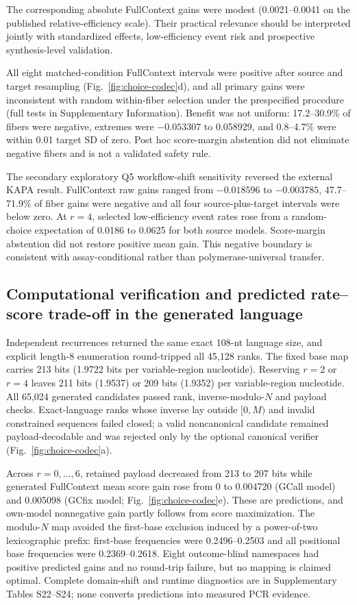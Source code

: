 \documentclass[unnumsec,webpdf,modern,large]{oup-authoring-template}
\begin{document}
The corresponding absolute FullContext gains were modest (0.0021--0.0041 on the published relative-efficiency scale). Their practical relevance should be interpreted jointly with standardized effects, low-efficiency event risk and prospective synthesis-level validation.

All eight matched-condition FullContext intervals were positive after source and target resampling (Fig.~\ref{fig:choice-codec}d), and all primary gains were inconsistent with random within-fiber selection under the prespecified procedure (full tests in Supplementary Information). Benefit was not uniform: 17.2--30.9\% of fibers were negative, extremes were $-0.053307$ to 0.058929, and 0.8--4.7\% were within 0.01 target SD of zero. Post hoc score-margin abstention did not eliminate negative fibers and is not a validated safety rule.

The secondary exploratory Q5 workflow-shift sensitivity reversed the external KAPA result. FullContext raw gains ranged from $-0.018596$ to $-0.003785$, 47.7--71.9\% of fiber gains were negative and all four source-plus-target intervals were below zero. At $r=4$, selected low-efficiency event rates rose from a random-choice expectation of 0.0186 to 0.0625 for both source models. Score-margin abstention did not restore positive mean gain. This negative boundary is consistent with assay-conditional rather than polymerase-universal transfer.

\subsection{Computational verification and predicted rate--score trade-off in the generated language}

Independent recurrences returned the same exact 108-nt language size, and explicit length-8 enumeration round-tripped all 45,128 ranks. The fixed base map carries 213 bits (1.9722 bits per variable-region nucleotide). Reserving $r=2$ or $r=4$ leaves 211 bits (1.9537) or 209 bits (1.9352) per variable-region nucleotide. All 65,024 generated candidates passed rank, inverse-modulo-$N$ and payload checks. Exact-language ranks whose inverse lay outside $[0,M)$ and invalid constrained sequences failed closed; a valid noncanonical candidate remained payload-decodable and was rejected only by the optional canonical verifier (Fig.~\ref{fig:choice-codec}a).

Across $r=0,\ldots,6$, retained payload decreased from 213 to 207 bits while generated FullContext mean score gain rose from 0 to 0.004720 (GCall model) and 0.005098 (GCfix model; Fig.~\ref{fig:choice-codec}e). These are predictions, and own-model nonnegative gain partly follows from score maximization. The modulo-$N$ map avoided the first-base exclusion induced by a power-of-two lexicographic prefix: first-base frequencies were 0.2496--0.2503 and all positional base frequencies were 0.2369--0.2618. Eight outcome-blind namespaces had positive predicted gains and no round-trip failure, but no mapping is claimed optimal. Complete domain-shift and runtime diagnostics are in Supplementary Tables S22--S24; none converts predictions into measured PCR evidence.
\end{document}
